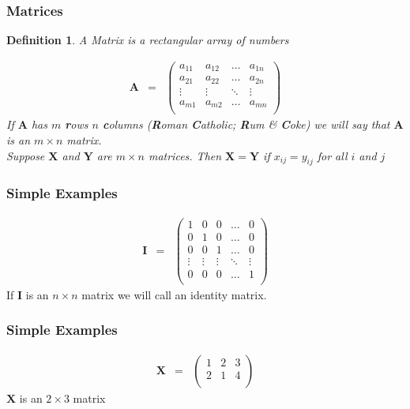 \documentclass{beamer}
\newtheorem{defn}{Definition}
\numberwithin{equation}{section}
\begin{document}
\begin{frame}
\frametitle{Matrices}

\begin{defn}
A Matrix is a rectangular array of numbers


\begin{eqnarray}
\boldsymbol{A} & = &  
\begin{pmatrix}
a_{11} & a_{12} & \hdots & a_{1n} \\
a_{21} & a_{22} & \hdots & a_{2n} \\
\vdots & \vdots & \ddots & \vdots \\
a_{m1} & a_{m2} & \hdots & a_{mn} \\
\end{pmatrix} 
\nonumber 
\end{eqnarray}
If $\boldsymbol{A}$ has $m$ \textbf{r}ows $n$ \textbf{c}olumns (\textbf{R}oman \textbf{C}atholic; \textbf{R}um \& \textbf{C}oke) we will say that $\boldsymbol{A}$ is an $m \times n$ matrix.  \\
Suppose $\boldsymbol{X}$ and $\boldsymbol{Y}$ are $m \times n$ matrices.  Then $\boldsymbol{X} = \boldsymbol{Y}$ if 
$x_{ij} = y_{ij}$ for all $i$ and $j$ 

\end{defn}
\end{frame}



\begin{frame}
\frametitle{Simple Examples} 

\begin{eqnarray} 
\boldsymbol{I} & = & \begin{pmatrix} 
1 & 0 & 0 & \hdots & 0 \\
0 & 1 & 0 & \hdots & 0 \\
0 & 0 & 1 & \hdots & 0 \\
\vdots & \vdots & \vdots & \ddots & \vdots \\
0 & 0 & 0 & \hdots & 1 \\
\end{pmatrix} 
\nonumber 
\end{eqnarray}
If $\boldsymbol{I}$ is an $n \times n$ matrix we will call an identity matrix.  

\end{frame}



\begin{frame}
\frametitle{Simple Examples} 

\begin{eqnarray}
\boldsymbol{X} & = & \begin{pmatrix} 
1 & 2 & 3 \\
2 & 1 & 4 \\
\end{pmatrix} 
\nonumber 
\end{eqnarray}
$\boldsymbol{X}$ is an $2 \times 3$ matrix

\end{frame}
\end{document}
